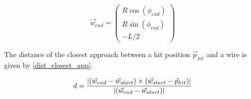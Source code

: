 \begin{equation}
  \vec{w}_{end} = \begin{pmatrix}
    R \cos(\phi_{end}) \\
    R \sin(\phi_{end}) \\
    -L/2
  \end{pmatrix}
  \label{eq_wend}
\end{equation}

The distance of the closest approach between a hit position $\vec{p}_{hit}$ and a wire is given by \cref{dist_closest_app}.

\begin{equation}
  d = {{|(\vec{w}_{end}-\vec{w}_{start}) \times
    (\vec{w}_{start}-\vec{p}_{hit}) |} \over {|(\vec{w}_{end}-\vec{w}_{start})|}}
    \label{dist_closest_app}
\end{equation}
